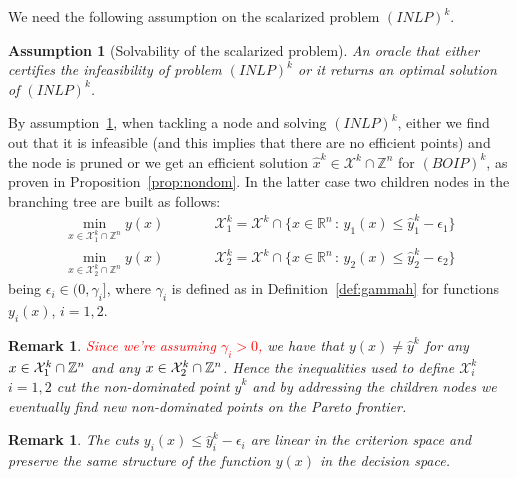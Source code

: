 \documentclass[preprint,12pt]{elsarticle}
\newcommand{\red}[1]{\textcolor{red}{#1}}
\newtheorem{remark}[theorem]{Remark}
\newtheorem{assumption}[theorem]{Assumption}
\def\X{{\cal X}}
\def\R{\mathbb{R}}
\def\Z{\mathbb{Z}}
\begin{document}
We need the following assumption on
the scalarized problem $(INLP)^k$.
\begin{assumption}[Solvability of the scalarized problem]\label{ass:oracle}
An oracle that either certifies the infeasibility of problem  $(INLP)^k$ or it returns an optimal solution of $(INLP)^k$.
\end{assumption}

By assumption~\ref{ass:oracle}, when tackling a node and solving $(INLP)^k$, either we find out that it is infeasible
(and this implies that there are no efficient points) and the node is pruned
or we get an efficient solution $\hat x^k\in \mathcal{X}^k\cap \Z^n$ for $(BOIP)^k$, as proven in Proposition~\ref{prop:nondom}.
In the latter case two children nodes in the branching tree are built as follows:
%
\begin{equation*}\begin{array}{lcl}
 \displaystyle\min_{x\in \mathcal{X}^k_1\cap \Z^n} y(x) & \qquad&\displaystyle\mathcal{X}^k_1 = \mathcal{X}^k \cap \{x\in \R^n\,:\, y_1(x)\leq \hat y^k_1 - \epsilon_1 \}
\\[1.2em]
 \displaystyle\min_{x\in \mathcal{X}^k_2\cap \Z^n} y(x) & \qquad& \displaystyle\mathcal{X}^k_2 = \mathcal{X}^k \cap \{x\in \R^n\,:\, y_2(x)\leq \hat y^k_2 - \epsilon_2 \}
\end{array}
\end{equation*}
being $\epsilon_i\in (0,\gamma_i]$, where $\gamma_i$ is defined as in Definition~\ref{def:gammah} for functions $y_i(x)$, $i=1,2$.

%
\begin{remark}\label{rem:const}
\red{ Since we're assuming $\gamma_i>0$,} we have that $y(x)\neq \hat y^k$  for any $x\in \X^k_{1}\cap \Z^n$ and any $x\in \X^k_2\cap \Z^n$.
 Hence the inequalities used to define  $\mathcal{X}^k_i$ $i=1,2$  cut the non-dominated point $\hat y^k$ and
 by addressing the children nodes we eventually find new non-dominated points on the Pareto frontier.
\end{remark}
%

\begin{remark}\label{rem:cuts}
The cuts $ y_i(x)\leq \hat y^k_i - \epsilon_i$ are linear in the criterion space and preserve the same structure of the function $y(x)$ in the decision space.
\end{remark}
\end{document}
